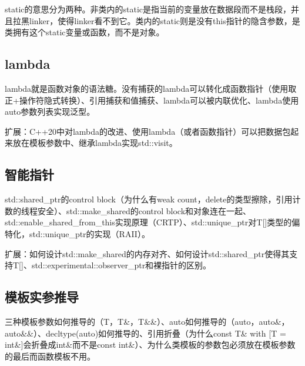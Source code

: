 static的意思分为两种。非类内的static是指当前的变量放在数据段而不是栈段，并且拉黑linker，使得linker看不到它。类内的static则是没有this指针的隐含参数，是类拥有这个static变量或函数，而不是对象。

\subsection{lambda}
lambda就是函数对象的语法糖。没有捕获的lambda可以转化成函数指针（使用取正+操作符隐式转换）、引用捕获和值捕获、lambda可以被内联优化、lambda使用auto参数列表实现泛型。

扩展：C++20中对lambda的改进、使用lambda（或者函数指针）可以把数据包起来放在模板参数中、继承lambda实现std::visit。

\subsection{智能指针}
std::shared\_ptr的control block（为什么有weak count，delete的类型擦除，引用计数的线程安全）、std::make\_shared的control block和对象连在一起、std::enable\_shared\_from\_this实现原理（CRTP）、std::unique\_ptr对T[]类型的偏特化，std::unique\_ptr的实现（RAII）。

扩展：如何设计std::make\_shared的内存对齐、如何设计std::shared\_ptr使得其支持T[]、std::experimental::observer\_ptr和裸指针的区别。

\subsection{模板实参推导}
三种模板参数如何推导的（T，T\&，T\&\&）、auto如何推导的（auto，auto\&，auto\&\&）、decltype(auto)如何推导的、引用折叠（为什么const T\& with [T = int\&]会折叠成int\&而不是const int\&）、为什么类模板的参数包必须放在模板参数的最后而函数模板不用。
